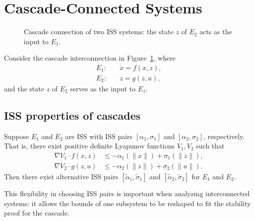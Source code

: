 \section{Cascade-Connected Systems}

\begin{figure}[h]
\centering
{}
\caption{Cascade connection of two ISS systems: the state $z$ of $E_2$ acts as the input to $E_1$.}
\label{fig:cascade}
\end{figure}

Consider the cascade interconnection in Figure~\ref{fig:cascade}, where 
\begin{align}
E_1: \quad & \dot{x} = f(x,z), \\
E_2: \quad & \dot{z} = g(z,u),
\end{align}
and the state $z$ of $E_2$ serves as the input to $E_1$. 

\subsection{ISS properties of cascades}

\begin{proposition}
Suppose $E_1$ and $E_2$ are ISS with ISS pairs $[\alpha_1,\sigma_1]$ and 
$[\alpha_2,\sigma_2]$, respectively. That is, there exist positive definite Lyapunov 
functions $V_1,V_2$ such that
\begin{align}
\nabla V_1 \cdot f(x,z) &\le -\alpha_1(\|x\|) + \sigma_1(\|z\|), \\
\nabla V_2 \cdot g(z,u) &\le -\alpha_2(\|z\|) + \sigma_2(\|u\|).
\end{align}
Then there exist alternative ISS pairs $[\tilde{\alpha}_1,\tilde{\sigma}_1]$ and 
$[\tilde{\alpha}_2,\tilde{\sigma}_2]$ for $E_1$ and $E_2$.
\end{proposition}

\begin{remark}
This flexibility in choosing ISS pairs is important when analyzing interconnected systems: 
it allows the bounds of one subsystem to be reshaped to fit the stability proof for the cascade.
\end{remark}

